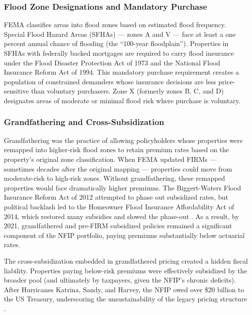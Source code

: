 \documentclass[12pt]{article}
\begin{document}
\subsubsection*{Flood Zone Designations and Mandatory Purchase} FEMA classifies areas into flood zones based on estimated flood frequency. Special Flood Hazard Areas (SFHAs) --- zones A and V --- face at least a one percent annual chance of flooding (the ``100-year floodplain''). Properties in SFHAs with federally backed mortgages are required to carry flood insurance under the Flood Disaster Protection Act of 1973 and the National Flood Insurance Reform Act of 1994. This mandatory purchase requirement creates a population of constrained demanders whose insurance decisions are less price-sensitive than voluntary purchasers. Zone X (formerly zones B, C, and D) designates areas of moderate or minimal flood risk where purchase is voluntary.

\subsubsection*{Grandfathering and Cross-Subsidization} Grandfathering was the practice of allowing policyholders whose properties were remapped into higher-risk flood zones to retain premium rates based on the property's original zone classification. When FEMA updated FIRMs --- sometimes decades after the original mapping --- properties could move from moderate-risk to high-risk zones. Without grandfathering, these remapped properties would face dramatically higher premiums. The Biggert-Waters Flood Insurance Reform Act of 2012 attempted to phase out subsidized rates, but political backlash led to the Homeowner Flood Insurance Affordability Act of 2014, which restored many subsidies and slowed the phase-out \citep{horn2018}. As a result, by 2021, grandfathered and pre-FIRM subsidized policies remained a significant component of the NFIP portfolio, paying premiums substantially below actuarial rates.

The cross-subsidization embedded in grandfathered pricing created a hidden fiscal liability. Properties paying below-risk premiums were effectively subsidized by the broader pool (and ultimately by taxpayers, given the NFIP's chronic deficits). After Hurricanes Katrina, Sandy, and Harvey, the NFIP owed over \$20 billion to the US Treasury, underscoring the unsustainability of the legacy pricing structure \citep{michel-kerjan2015, kousky2018}.
\end{document}
